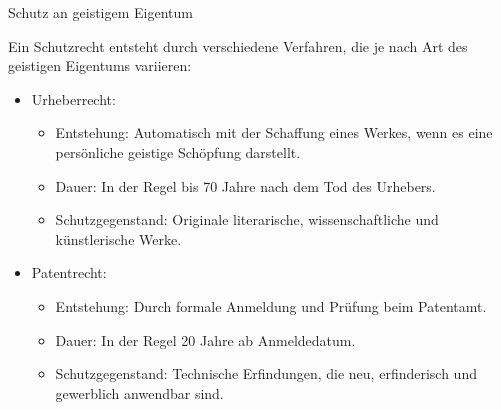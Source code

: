 \documentclass{article}
\begin{document}
\begin{exercise}{Schutz an geistigem Eigentum}
\begin{enumerate}
          \begin{solution}
            Ein Schutzrecht entsteht durch verschiedene Verfahren, die je nach Art des geistigen Eigentums variieren:
            \begin{itemize}
              \item Urheberrecht:
                    \begin{itemize}
                      \item Entstehung: Automatisch mit der Schaffung eines Werkes, wenn es eine persönliche geistige Schöpfung darstellt.
                      \item Dauer: In der Regel bis 70 Jahre nach dem Tod des Urhebers.
                      \item Schutzgegenstand: Originale literarische, wissenschaftliche und künstlerische Werke.
                    \end{itemize}
              \item Patentrecht:
                    \begin{itemize}
                      \item Entstehung: Durch formale Anmeldung und Prüfung beim Patentamt.
                      \item Dauer: In der Regel 20 Jahre ab Anmeldedatum.
                      \item Schutzgegenstand: Technische Erfindungen, die neu, erfinderisch und gewerblich anwendbar sind.
                    \end{itemize}
            \end{itemize}
          \end{solution}
  \end{enumerate}
\end{exercise}
\end{document}
